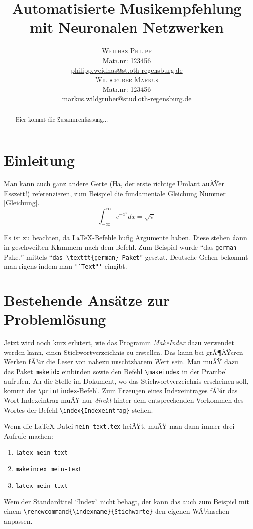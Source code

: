 \documentclass[twosided,a4,10pt]{article}
\title{\vspace{-5mm}%
	\fontsize{20pt}{10pt}\selectfont
	\textbf{Automatisierte Musikempfehlung mit Neuronalen Netzwerken}
	}
\author{
	\large
       \begin{minipage}[t]{0.5\linewidth}
         \begin{center}
           	\textsc{Weidhas Philipp}\\[2mm]
                 \normalsize	Matr.nr: 123456\\
                 \normalsize
                 \href{mailto:philipp.weidhas@st.oth-regensburg.de}
                 {philipp.weidhas@st.oth-regensburg.de}      
         \end{center}
       \end{minipage}        
       \begin{minipage}[t]{0.5\linewidth}
         \begin{center}
           	\textsc{Wildgruber Markus}\\[2mm]
                 \normalsize	Matr.nr: 123456\\
                 \normalsize
                 \href{mailto:markus.wildgruber@stud.oth-regensburg.de}
                 {markus.wildgruber@stud.oth-regensburg.de}      
         \end{center}
       \end{minipage}
     }
\begin{document}
\maketitle
\thispagestyle{fancy}

	

\begin{multicols}{2}

\begin{abstract}
\noindent Hier kommt die Zusammenfassung...
\end{abstract}


\section{Einleitung}

Man kann auch ganz andere Gerte (Ha, der erste richtige Umlaut auÃŸer
Esszett!) referenzieren, zum Beispiel die fundamentale Gleichung Nummer
\ref{Gleichung}.
\begin{equation}\label{Gleichung}
\int^{\infty}_{-\infty} e^{-x^{2}}dx = \sqrt{\pi} 
\end{equation}

Es ist zu beachten, da \LaTeX-Befehle hufig Argumente haben. Diese stehen
dann in geschweiften Klammern nach dem Befehl. Zum Beispiel wurde "`das
\texttt{german}-Paket"' mittels "`\verb+das \texttt{german}-Paket+"'
gesetzt. Deutsche Gchen bekommt man rigens indem man \verb+"`Text"'+
eingibt. 

\section{Bestehende Ansätze zur Problemlösung}


Jetzt wird noch kurz erlutert, wie das Programm
\textit{MakeIndex} dazu verwendet werden
kann, einen Stichwortverzeichnis zu erstellen. Das kann bei grÃ¶ÃŸeren Werken
fÃ¼r die Leser von nahezu unschtzbarem Wert sein. 
Man muÃŸ dazu das Paket
\texttt{makeidx} einbinden sowie
den Befehl \verb+\makeindex+ in der Prambel aufrufen. An die Stelle im
Dokument, wo das Stichwortverzeichnis erscheinen soll, kommt der
\verb+\printindex+-Befehl. Zum Erzeugen eines Indexeintrages fÃ¼r das Wort
Indexeintrag muÃŸ nur \emph{direkt} hinter dem
entsprechenden Vorkommen des Wortes der Befehl \verb+\index{Indexeintrag}+
stehen.

Wenn die \LaTeX-Datei \texttt{mein-text.tex} heiÃŸt, muÃŸ man dann immer drei
Aufrufe machen:
\begin{enumerate}
	\item \texttt{latex mein-text}
	\item \texttt{makeindex mein-text}
	\item \texttt{latex mein-text}
\end{enumerate}
Wem der Standardtitel "`Index"' nicht behagt, der kann das auch zum Beispiel
mit einem \verb+\renewcommand{\indexname}{Stichworte}+ den eigenen WÃ¼nschen
anpassen. 


\end{multicols}
\end{document}
